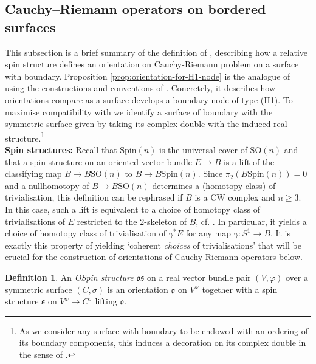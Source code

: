 \documentclass[11pt,psamsfonts, oneside, reqno]{amsart}
\newcommand{\cl}{\colon}
\newcommand{\fo}{\mathfrak{o}}
\newcommand{\fs}{\mathfrak{s}}
\theoremstyle{definition}
\newtheorem{definition}[theorem]{Definition}
\theoremstyle{remark}
\numberwithin{equation}{section}
\begin{document}
\subsection{Cauchy--Riemann operators on bordered surfaces}\label{subsec:orientation-construction} This subsection is a brief summary of the definition of \cite{CZ24}, describing how a relative spin structure defines an orientation on Cauchy-Riemann problem on a surface with boundary. Proposition \ref{prop:orientation-for-H1-node} is the analogue of \cite[Theorem~4.3.3(c)]{WW17} using the constructions and conventions of \cite{CZ24}. Concretely, it describes how orientations compare as a surface develops a boundary node of type (H1). To maximise compatibility with \cite{CZ24} we identify a surface of boundary with the symmetric surface given by taking its complex double with the induced real structure.\footnote{As we consider any surface with boundary to be endowed with an ordering of its boundary components, this induces a decoration on its complex double in the sense of \cite{CZ24}.}\\


\noindent\textbf{Spin structures: }Recall that $\text{Spin}(n)$ is the universal cover of $\text{SO}(n)$ and that a spin structure on an oriented vector bundle $E\to B$ is a lift of the classifying map $B\to B\text{SO}(n)$ to $B\to B\text{Spin}(n)$. 
Since $\pi_2(B\text{Spin}(n))  =0$ and a nullhomotopy of $B\to B\text{SO}(n)$ determines a (homotopy class) of trivialisation, this definition can be rephrased if $B$ is a CW complex and $n \ge 3$. In this case, such a lift is equivalent to a choice of homotopy class of trivialisations of $E$ restricted to the $2$-skeleton of $B$, cf. \cite[Definition~1.2]{CZ24}. In particular, it yields a choice of homotopy class of trivialisation of $\gamma^*E$ for any map $\gamma\cl S^1\to B$. It is exactly this property of yielding `coherent \emph{choices} of trivialisations' that will be crucial for the construction of orientations of Cauchy-Riemann operators below.


\begin{definition}\label{de:ospin} An \emph{OSpin structure} $\fo\fs$ on a real vector bundle pair $(V,\varphi)$ over a symmetric surface $(C,\sigma)$ is an orientation $\fo$ on $V^\varphi$ together with a spin structure $\fs$ on $V^\varphi \to C^\sigma$ lifting $\fo$.
\end{definition}
\end{document}

